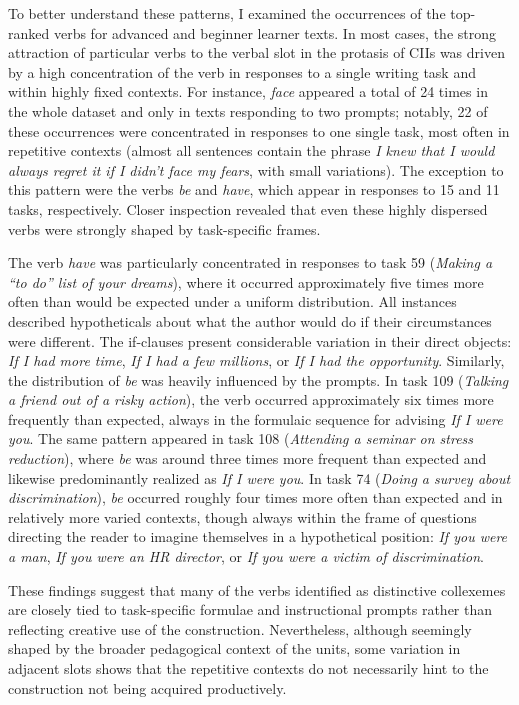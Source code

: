 To better understand these patterns, I examined the occurrences of the top-ranked verbs for advanced and beginner learner texts.
In most cases, the strong attraction of particular verbs to the verbal slot in the protasis of CIIs was driven by a high concentration of the verb in responses to a single writing task and within highly fixed contexts.
For instance, \textit{face} appeared a total of 24 times in the whole dataset and only in texts responding to two prompts; notably, 22 of these occurrences were concentrated in responses to one single task, most often in repetitive contexts (almost all sentences contain the phrase \textit{I knew that I would always regret it if I didn't face my fears}, with small variations). 
The exception to this pattern were the verbs \textit{be} and \textit{have}, which appear in responses to 15 and 11 tasks, respectively. 
Closer inspection revealed that even these highly dispersed verbs were strongly shaped by task-specific frames.

The verb \textit{have} was particularly concentrated in responses to task 59 (\textit{Making a ``to do'' list of your dreams}), where it occurred approximately five times more often than would be expected under a uniform distribution.
 All instances described hypotheticals about what the author would do if their circumstances were different. The if-clauses present considerable variation in their direct objects: \textit{If I had more time}, \textit{If I had a few millions}, or \textit{If I had the opportunity}.
Similarly, the distribution of \textit{be} was heavily influenced by the prompts. In task 109 (\textit{Talking a friend out of a risky action}), the verb occurred approximately six times more frequently than expected, always in the formulaic sequence for advising \textit{If I were you}. 
The same pattern appeared in task 108 (\textit{Attending a seminar on stress reduction}), where \textit{be} was around three times more frequent than expected and likewise predominantly realized as \textit{If I were you}. In task 74 (\textit{Doing a survey about discrimination}), \textit{be} occurred roughly four times more often than expected and in relatively more varied contexts, though always within the frame of questions directing the reader to imagine themselves in a hypothetical position:
\textit{If you were a man}, \textit{If you were an HR director}, or \textit{If you were a victim of discrimination}.

These findings suggest that many of the verbs identified as distinctive collexemes are closely tied to task-specific formulae and instructional prompts rather than reflecting creative use of the construction.
Nevertheless, although seemingly shaped by the broader pedagogical context of the units, some variation in adjacent slots shows that the repetitive contexts do not necessarily hint to the construction not being acquired productively.

